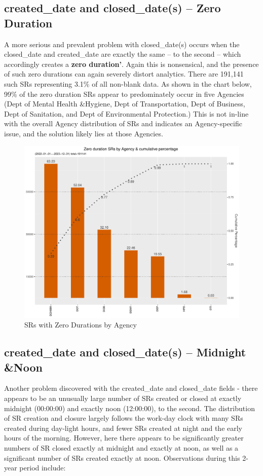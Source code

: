 \documentclass[12pt, titlepage]{article}
\begin{document}
\subsection{created\_date and closed\_date(s) --  Zero Duration}
\label{sec: zeroduration}		
A more serious and prevalent problem with closed\_date(s) 
occurs when the closed\_date and created\_date are exactly the same -- to 
the second -- which accordingly creates a \textbf{zero duration'}. Again 
this is nonsensical, and the presence of such zero durations can again 
severely distort analytics. There are 191,141 such SRs representing 3.1\% of 
all non-blank data. As shown in the chart 	below, 99\% of the 
zero duration SRs appear to predominately occur in five 
Agencies (Dept of Mental Health \&Hygiene, Dept of Transportation, 
Dept of Business, Dept of Sanitation, and Dept of Environmental Protection.) 
This is not in-line with the overall Agency distribution of SRs and indicates an 
Agency-specific issue, and the solution likely lies at those Agencies.
	
\begin{figure}[tbp]
	 \centering
	 \includegraphics[width = \textwidth]{zero_duration_SR.pdf}
	 \caption{SRs with Zero Durations by Agency}
	 \label{fig:zero-duration}
\end{figure}	
		
\subsection{created\_date and closed\_date(s) -- Midnight \&Noon}
\label{sec:midnightandnoon}
Another problem discovered with the created\_date and 
closed\_date fields - there appears to be an unusually large number of SRs 
created or closed at exactly midnight (00:00:00) and exactly noon (12:00:00), 
to the second. The distribution of SR creation and closure largely follows the 
work-day clock with many SRs created during day-light hours, and 
fewer SRs 	created at night and the early hours of the morning. However, 
here there appears to be significantly greater numbers of SR closed exactly 
at midnight and exactly at noon, as well as a significant number of SRs 
created exactly at noon. Observations during this 2-year period include:
	
\end{document}
